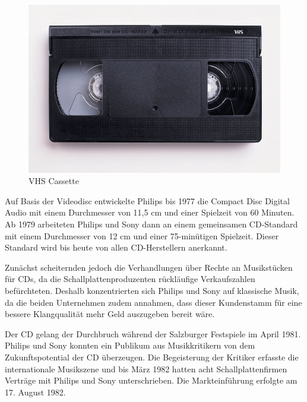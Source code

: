 {\begin{figure}[h]
\begin{center}
            \begin{minipage}[t]{0.3\textwidth}
                \begin{center}
                    \includegraphics[height=0.1\textheight]{Bilder/Optische_Datentraeger_Die_Compact_Disc/Geschichte/vhs.png}
                    \caption[VHS cassette \newline \url{https://upload.wikimedia.org/wikipedia/commons/6/67/VHS-cassette.jpg} (zuletzt aufgerufen am 19.09.2015)]{VHS Cassette}
                    \label{fig:vhs}
                \end{center}
            \end{minipage}
        \end{center}
    \end{figure}
}{}

Auf Basis der Videodisc entwickelte Philips bis 1977 die Compact Disc Digital
Audio mit einem Durchmesser von 11,5 cm und einer Spielzeit von 60 Minuten. Ab
1979 arbeiteten Philips und Sony dann an einem gemeinsamen CD-Standard mit einem
Durchmesser von 12 cm und einer 75-minütigen Spielzeit. Dieser Standard wird bis
heute von allen CD-Herstellern anerkannt. \cite{cds}

Zunächst scheiternden jedoch die Verhandlungen über Rechte an Musikstücken für
CDs, da die Schallplattenproduzenten rückläufige Verkaufszahlen befürchteten.
Deshalb konzentrierten sich Philips und Sony auf klassische Musik, da die beiden
Unternehmen zudem annahmen, dass dieser Kundenstamm für eine bessere
Klangqualität mehr Geld auszugeben bereit wäre.

Der CD gelang der Durchbruch während der Salzburger Festspiele im April 1981.
Philips und Sony konnten ein Publikum aus Musikkritikern von dem
Zukunftspotential der CD überzeugen. Die Begeisterung der Kritiker erfasste die
internationale Musikszene und bis März 1982 hatten acht Schallplattenfirmen
Verträge mit Philips und Sony unterschrieben. Die Markteinführung erfolgte am
17. August 1982. \cite{cuz}

